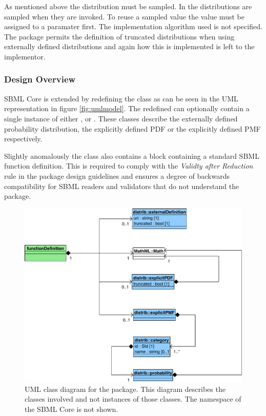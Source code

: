 \documentclass[draftspec]{sbmlpkgspec}
\begin{document}
As mentioned above the distribution must be sampled. In \distribshort
the distributions are sampled when they are invoked. To reuse a
sampled value the value must be assigned to a paramater first. The
implementation algorithm used is not specified. The package permits
the definition of truncated distributions when using externally
defined distributions and again how this is implemented is left to the
implementor.

\subsubsection{Design Overview}

SBML Core is extended by redefining the \FunctionDefinition class as
can be seen in the UML representation in figure
\vref{fig:umlmodel}. The redefined \FunctionDefinition can optionally
contain a single instance of either ,
 or . These classes describe the
externally defined probability distribution, the explicitly defined
PDF or the explicitly defined PMF respectively.

Slightly anomalously the \FunctionDefinition class also contains a
\mathml block containing a standard SBML function definition. This is
required to comply with the \emph{Validty after Reduction} rule in the
package design guidelines \cite{sbmll3v1packrule} and ensures a degree
of backwards compatibility for SBML readers and validators that do not
understand the \distribshort package.

\begin{figure}[htb]
\includegraphics[width=0.75\linewidth]{DistribUMLModel.pdf}
\caption{UML class diagram for the \distrib package. This diagram
  describes the classes involved and not instances of those
  classes. The namespace of the SBML Core is not shown.}
\label{fig:umlmodel}
\end{figure}
\end{document}
